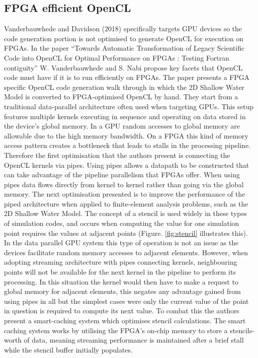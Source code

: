 \documentclass{mpaper}
\begin{document}
\subsection{FPGA efficient OpenCL}

Vanderbauwhede and Davidson (2018) \cite{VanderbauwhedeDavidson2018} specifically targets GPU devices so the code generation portion is not optimised to generate OpenCL for execution on FPGAs. In the paper ``Towards Automatic Transformation of Legacy Scientific Code into OpenCL for Optimal Performance on FPGAs : Testing Fortran contiguity'' \cite{VanderbauwhedeNabi2018} W. Vanderbauwhede and S. Nabi propose key facets that OpenCL code must have if it is to run efficiently on FPGAs. The paper presents a FPGA specific OpenCL code generation walk through in which the 2D Shallow Water Model \cite{Hall2009} is converted to FPGA-optimised OpenCL by hand. They start from a traditional data-parallel architecture often used when targeting GPUs. This setup features multiple kernels executing in sequence and operating on data stored in the device's global memory. In a GPU random accesses to global memory are allowable due to the high memory bandwidth. On a FPGA this kind of memory access pattern creates a bottleneck that leads to stalls in the processing pipeline. Therefore the first optimisation that the authors present is connecting the OpenCL kernels via pipes. Using pipes allows a datapath to be constructed that can take advantage of the pipeline parallelism that FPGAs offer. When using pipes data flows directly from kernel to kernel rather than going via the global memory. The next optimisation presented  is to improve the performance of the piped architecture when applied to finite-element analysis problems, such as the 2D Shallow Water Model. The concept of a stencil is used widely in these types of simulation codes, and occurs when computing the value for one simulation point requires the values at adjacent points (Figure. \ref{fig:stencil} illustrates this). In the data parallel GPU system this type of operation is not an issue as the devices facilitate random memory accesses to adjacent elements. However, when adopting streaming architecture with pipes connecting kernels, neighbouring points will not be available for the next kernel in the pipeline to perform its processing. In this situation the kernel would then have to make a request to global memory for adjacent elements, this negates any advantage gained from using pipes in all but the simplest cases were only the current value of the point in question is required to compute its next value. To combat this the authors present a smart-caching system which optimises stencil calculations. The smart caching system works by utilising the FPGA's on-chip memory to store a stencils-worth of data, meaning streaming performance is maintained after a brief stall while the stencil buffer initially populates. 
\end{document}
